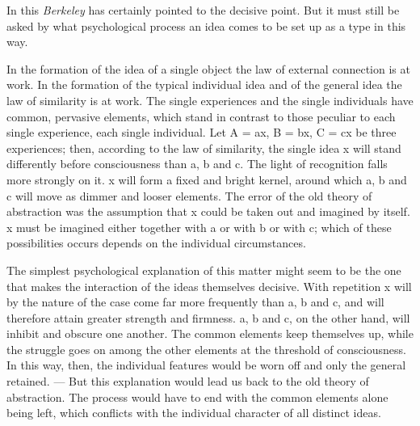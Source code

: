 \documentclass[12pt,a4paper]{book}
\newcommand{\opage}[1]{\marginnote{\footnotesize\textit{[#1]}}}
\begin{document}
In this \emph{Berkeley} has certainly pointed to the decisive point. But
it must still be asked by what psychological process an idea comes to be
set up as a type in this way.

In the formation of the idea of a single object the law of external
connection is at work. In the formation of the typical individual idea
and of the general idea the law of similarity is at work. The single
experiences and the single individuals have common, pervasive elements,
which stand in contrast to those peculiar to each single experience,
each single individual. Let A = ax, B = bx, C = cx be three experiences;
then, according to the law of similarity, the single idea x will stand
differently before consciousness than a, b and c. The light of
recognition falls more strongly on it. x will form a fixed and bright
kernel, around which a, b and c will move as dimmer and looser elements.
The error of the old theory of abstraction was the assumption that x
could be taken out and imagined by itself. x must be imagined either
together with a or with b or with c; which of these possibilities occurs
depends on the individual circumstances.

\opage{203}The simplest psychological explanation of this matter might
seem to be the one that makes the interaction of the ideas themselves
decisive. With repetition x will by the nature of the case come far more
frequently than a, b and c, and will therefore attain greater strength
and firmness. a, b and c, on the other hand, will inhibit and obscure
one another. The common elements keep themselves up, while the struggle
goes on among the other elements at the threshold of consciousness. In
this way, then, the individual features would be worn off and only the
general retained. --- But this explanation would lead us back to the old
theory of abstraction. The process would have to end with the common
elements alone being left, which conflicts with the individual character
of all distinct ideas.
\end{document}
